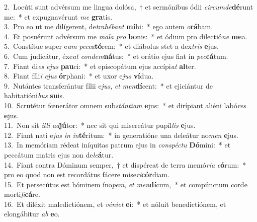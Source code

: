 {2.~}Locúti sunt advérsum me lingua dolósa,~† et sermónibus ódii \textit{cir}\textit{cum}\textit{de}\textbf{dé}runt me:~* et expugnavérunt \textit{me} \textbf{gra}tis.\\
{3.~}Pro eo ut me dilígerent, de\textit{tra}\textit{hé}\textit{bant} \textbf{mi}hi:~* ego autem \textit{o}\textbf{rá}bam.\\
{4.~}Et posuérunt advérsum me \textit{ma}\textit{la} \textit{pro} \textbf{bo}nis:~* et ódium pro dilectió\textit{ne} \textbf{me}a.\\
{5.~}Constítue super e\textit{um} \textit{pec}\textit{ca}\textbf{tó}rem:~* et diábolus stet a dex\textit{tris} \textbf{e}jus.\\
{6.~}Cum judicátur, éxe\textit{at} \textit{con}\textit{dem}\textbf{ná}tus:~* et orátio ejus fiat in \textit{pec}\textbf{cá}tum.\\
{7.~}Fiant di\textit{es} \textit{e}\textit{jus} \textbf{pau}ci:~* et episcopátum ejus accípi\textit{at} \textbf{al}ter.\\
{8.~}Fiant fíli\textit{i} \textit{e}\textit{jus} \textbf{ór}phani:~* et uxor e\textit{jus} \textbf{ví}dua.\\
{9.~}Nutántes transferántur fílii e\textit{jus}, \textit{et} \textit{men}\textbf{dí}cent:~* et ejiciántur de habitatióni\textit{bus} \textbf{su}is.\\
{10.~}Scrutétur fœnerátor omnem sub\textit{stán}\textit{ti}\textit{am} \textbf{e}jus:~* et dirípiant aliéni labó\textit{res} \textbf{e}jus.\\
{11.~}Non sit \textit{il}\textit{li} \textit{ad}\textbf{jú}tor:~* nec sit qui misereátur pupíl\textit{lis} \textbf{e}jus.\\
{12.~}Fiant nati e\textit{jus} \textit{in} \textit{in}\textbf{té}ritum:~* in generatióne una deleátur no\textit{men} \textbf{e}jus.\\
{13.~}In memóriam rédeat iníquitas patrum ejus in \textit{con}\textit{spé}\textit{ctu} \textbf{Dó}mini:~* et peccátum matris ejus non de\textit{le}\textbf{á}tur.\\
{14.~}Fiant contra Dóminum semper,~† et dispéreat de terra memó\textit{ri}\textit{a} \textit{e}\textbf{ó}rum:~* pro eo quod non est recordátus fácere mise\textit{ri}\textbf{cór}diam.\\
{15.~}Et persecútus est hóminem íno\textit{pem}, \textit{et} \textit{men}\textbf{dí}cum,~* et compúnctum corde morti\textit{fi}\textbf{cá}re.\\
{16.~}Et diléxit maledictiónem, et \textit{vé}\textit{ni}\textit{et} \textbf{e}i:~* et nóluit benedictiónem, et elongábitur \textit{ab} \textbf{e}o.\\
